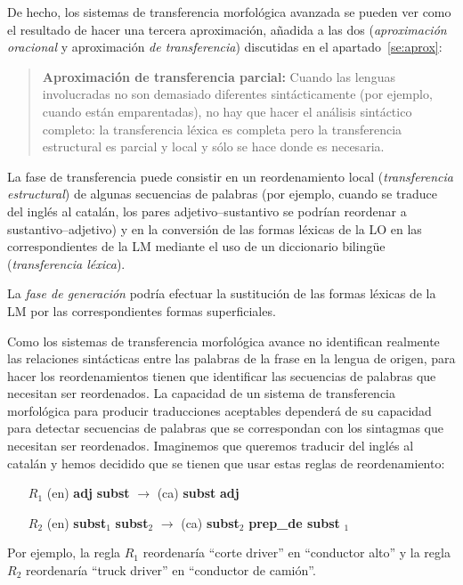 De hecho, los sistemas de transferencia morfológica avanzada se pueden ver como el resultado de hacer una tercera aproximación, añadida a las dos (\emph{aproximación oracional} y aproximación \emph{de transferencia}) discutidas en el apartado~\ref{se:aprox}: \begin{quote} \textbf{Aproximación de transferencia parcial:} Cuando las lenguas involucradas no son demasiado diferentes sintácticamente (por ejemplo, cuando están emparentadas), no hay que hacer el análisis sintáctico completo: la transferencia léxica es completa pero la transferencia estructural es parcial y local y sólo se hace donde es necesaria. \end{quote} 

La fase de transferencia \emph{} puede consistir en un reordenamiento local (\emph{transferencia estructural}) de algunas secuencias de palabras (por ejemplo, cuando se traduce del inglés al catalán, los pares adjetivo--sustantivo se podrían reordenar a sustantivo--adjetivo) y en la conversión de las formas léxicas de la LO en las correspondientes de la LM mediante el uso de un diccionario bilingüe (\emph{transferencia léxica}). 

La \emph{fase de generación} podría efectuar la sustitución de las formas léxicas de la LM por las correspondientes formas superficiales. 

Como los sistemas de transferencia morfológica avance no identifican realmente las relaciones sintácticas entre las palabras de la frase en la lengua de origen, para hacer los reordenamientos tienen que identificar las secuencias de palabras que necesitan ser reordenados. La capacidad de un sistema de transferencia morfológica para producir traducciones aceptables dependerá de su capacidad para detectar secuencias de palabras que se correspondan con los sintagmas que necesitan ser reordenados. Imaginemos que queremos traducir del inglés al catalán y hemos decidido que se tienen que usar estas reglas de reordenamiento: \begin{itemize} \item [$R_1$] (en) \textbf{adj} \textbf{subst} $\rightarrow$ (ca) \textbf{subst} \textbf{adj} \item [$R_2$] (en) \textbf{subst}$_1$ \textbf{subst}$_2$ $\rightarrow$ (ca) \textbf{subst}$_2$ \textbf{prep\_de subst} \textbf{}$_1$ \end{itemize} Por ejemplo, la regla $R_1$ reordenaría ``corte driver'' en ``conductor alto'' y la regla $R_2$ reordenaría ``truck driver'' en ``conductor de camión''. 

